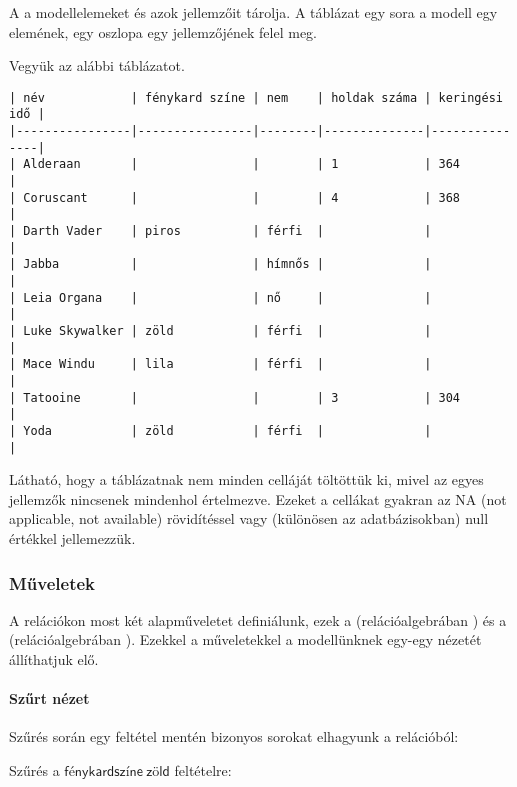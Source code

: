 \begin{definicio}
A  a modellelemeket és azok jellemzőit tárolja. A táblázat egy sora a modell egy elemének, egy oszlopa egy jellemzőjének felel meg.
\end{definicio}

\begin{pelda}
Vegyük az alábbi táblázatot.
\begin{verbatim}
| név            | fénykard színe | nem    | holdak száma | keringési idő |
|----------------|----------------|--------|--------------|---------------|
| Alderaan       |                |        | 1            | 364           |
| Coruscant      |                |        | 4            | 368           |
| Darth Vader    | piros          | férfi  |              |               |
| Jabba          |                | hímnős |              |               |
| Leia Organa    |                | nő     |              |               |
| Luke Skywalker | zöld           | férfi  |              |               |
| Mace Windu     | lila           | férfi  |              |               |
| Tatooine       |                |        | 3            | 304           |
| Yoda           | zöld           | férfi  |              |               |
\end{verbatim}
\end{pelda}
Látható, hogy a táblázatnak nem minden celláját töltöttük ki, mivel az egyes jellemzők nincsenek mindenhol értelmezve. Ezeket a cellákat gyakran az \textsf{NA} (not applicable, not available) rövidítéssel vagy (különösen az adatbázisokban) \textsf{null} értékkel jellemezzük.

\subsubsection{Műveletek}

A relációkon most két alapműveletet definiálunk, ezek a  (relációalgebrában ) és a  (relációalgebrában ). Ezekkel a műveletekkel a modellünknek egy-egy nézetét állíthatjuk elő.

\paragraph{Szűrt nézet}

Szűrés során egy feltétel mentén bizonyos sorokat elhagyunk a relációból:

Szűrés a $\mathsf{fénykard színe\: zöld}$ feltételre:

